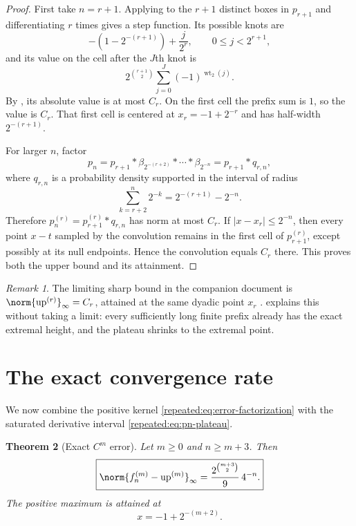 \documentclass[11pt,oneside]{article}
\newtheorem{theorem}{Theorem}[section]
\theoremstyle{definition}
\theoremstyle{remark}
\newtheorem{remark}[theorem]{Remark}
\newcommand{\Up}{\operatorname{up}}
\newcommand{\wt}{\operatorname{wt}_2}
\begin{document}
\begin{proof}
First take $n=r+1$.  Applying  to the $r+1$ distinct boxes in
$p_{r+1}$ and differentiating $r$ times gives a step function.  Its possible knots are
\[
 -\left(1-2^{-(r+1)}\right)+\frac{j}{2^r},
 \qquad 0\le j<2^{r+1},
\]
and its value on the cell after the $J$th knot is
\[
 2^{\binom{r+1}{2}}\sum_{j=0}^{J}(-1)^{\wt(j)}.
\]
By , its absolute value is at most $C_r$.  On the first cell the prefix
sum is $1$, so the value is $C_r$.  That first cell is centered at $x_r=-1+2^{-r}$ and has
half-width $2^{-(r+1)}$.

For larger $n$, factor
\[
 p_n=p_{r+1}*\beta_{2^{-(r+2)}}*\cdots*\beta_{2^{-n}}
     =p_{r+1}*q_{r,n},
\]
where $q_{r,n}$ is a probability density supported in the interval of radius
\[
 \sum_{k=r+2}^{n}2^{-k}=2^{-(r+1)}-2^{-n}.
\]
Therefore $p_n^{(r)}=p_{r+1}^{(r)}*q_{r,n}$ has norm at most $C_r$.  If
$|x-x_r|\le2^{-n}$, then every point $x-t$ sampled by the convolution remains in the first
cell of $p_{r+1}^{(r)}$, except possibly at its null endpoints.  Hence the convolution equals
$C_r$ there.  This proves both the upper bound and its attainment.
\end{proof}

\begin{remark}
The limiting sharp bound in the companion document is
$\norm{\Up^{(r)}}_\infty=C_r$, attained at the same dyadic point $x_r$ \cite{repeated:companion}.
 explains this without taking a limit: every sufficiently long finite
prefix already has the exact extremal height, and the plateau shrinks to the extremal point.
\end{remark}

\section{The exact convergence rate}
\label{repeated:sec:exact-rate}

We now combine the positive kernel \eqref{repeated:eq:error-factorization} with the saturated derivative
interval \eqref{repeated:eq:pn-plateau}.

\begin{theorem}[Exact $C^m$ error]
\label{repeated:thm:exact-Cm-error}
Let $m\ge0$ and $n\ge m+3$.  Then
\begin{equation}
 \boxed{\displaystyle
 \norm{f_n^{(m)}-\Up^{(m)}}_\infty
 =\frac{2^{\binom{m+3}{2}}}{9}\,4^{-n}.}                  \label{repeated:eq:exact-Cm-error}
\end{equation}
The positive maximum is attained at
\begin{equation}
 x=-1+2^{-(m+2)}.                                          \label{repeated:eq:error-extremal-point}
\end{equation}
\end{theorem}
\end{document}
